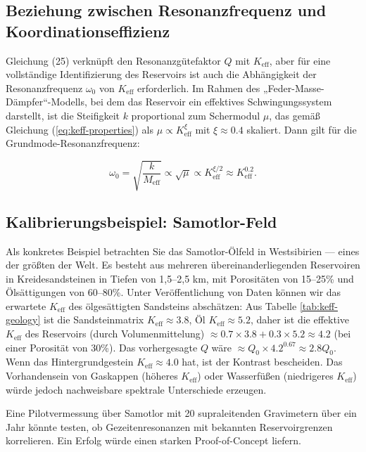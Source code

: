 \documentclass[12pt,a4paper]{article}
\theoremstyle{remark}
\newcommand{\Keff}{K_{\mathrm{eff}}}
\begin{document}
	\subsection{Beziehung zwischen Resonanzfrequenz und Koordinationseffizienz}
	\label{subsec:frequency_keff}
	
	Gleichung (25) verknüpft den Resonanzgütefaktor \(Q\) mit \(\Keff\), aber für eine vollständige Identifizierung des Reservoirs ist auch die Abhängigkeit der Resonanzfrequenz \(\omega_0\) von \(\Keff\) erforderlich. Im Rahmen des „Feder-Masse-Dämpfer“-Modells, bei dem das Reservoir ein effektives Schwingungssystem darstellt, ist die Steifigkeit \(k\) proportional zum Schermodul \(\mu\), das gemäß Gleichung (\ref{eq:keff-properties}) als \(\mu \propto \Keff^{\xi}\) mit \(\xi \approx 0.4\) skaliert. Dann gilt für die Grundmode-Resonanzfrequenz:
	
	\begin{equation}
		\omega_0 = \sqrt{\frac{k}{M_{\text{eff}}}} \propto \sqrt{\mu} \propto \Keff^{\xi/2} \approx \Keff^{0.2}.
		\label{eq:omega_keff}
	\end{equation}
	
	\subsection{Kalibrierungsbeispiel: Samotlor-Feld}
	
	Als konkretes Beispiel betrachten Sie das Samotlor-Ölfeld in Westsibirien — eines der größten der Welt. Es besteht aus mehreren übereinanderliegenden Reservoiren in Kreidesandsteinen in Tiefen von 1,5–2,5 km, mit Porositäten von 15–25\% und Ölsättigungen von 60–80\%. Unter Veröffentlichung von Daten können wir das erwartete $\Keff$ des ölgesättigten Sandsteins abschätzen: Aus Tabelle \ref{tab:keff-geology} ist die Sandsteinmatrix $\Keff \approx 3.8$, Öl $\Keff \approx 5.2$, daher ist die effektive $\Keff$ des Reservoirs (durch Volumenmittelung) \(\approx 0.7 \times 3.8 + 0.3 \times 5.2 \approx 4.2\) (bei einer Porosität von 30\%). Das vorhergesagte $Q$ wäre \(\approx Q_0 \times 4.2^{0.67} \approx 2.8 Q_0\). Wenn das Hintergrundgestein $\Keff \approx 4.0$ hat, ist der Kontrast bescheiden. Das Vorhandensein von Gaskappen (höheres $\Keff$) oder Wasserfüßen (niedrigeres $\Keff$) würde jedoch nachweisbare spektrale Unterschiede erzeugen.
	
	Eine Pilotvermessung über Samotlor mit 20 supraleitenden Gravimetern über ein Jahr könnte testen, ob Gezeitenresonanzen mit bekannten Reservoirgrenzen korrelieren. Ein Erfolg würde einen starken Proof-of-Concept liefern.
	
\end{document}
